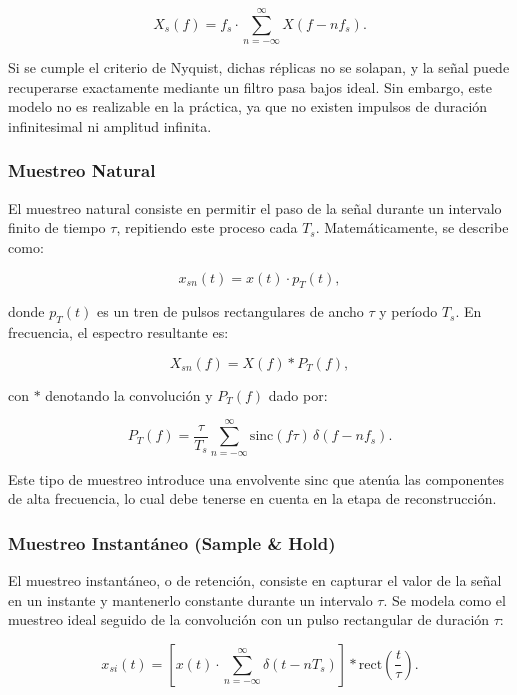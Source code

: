 \begin{equation}
    X_s(f) = f_s \cdot \sum_{n=-\infty}^{\infty} X(f-nf_s).
\end{equation}

Si se cumple el criterio de Nyquist, dichas réplicas no se solapan, y la señal puede recuperarse exactamente mediante un filtro pasa bajos ideal. Sin embargo, este modelo no es realizable en la práctica, ya que no existen impulsos de duración infinitesimal ni amplitud infinita.

\subsubsection{Muestreo Natural}
El muestreo natural consiste en permitir el paso de la señal durante un intervalo finito de tiempo $\tau$, repitiendo este proceso cada $T_s$. Matemáticamente, se describe como:

\begin{equation}
    x_{sn}(t) = x(t) \cdot p_T(t),
\end{equation}

donde $p_T(t)$ es un tren de pulsos rectangulares de ancho $\tau$ y período $T_s$.  
En frecuencia, el espectro resultante es:

\begin{equation}
    X_{sn}(f) = X(f) * P_T(f),
\end{equation}

con $*$ denotando la convolución y $P_T(f)$ dado por:

\begin{equation}
    P_T(f) = \frac{\tau}{T_s} \sum_{n=-\infty}^{\infty} \text{sinc}(f\tau)\,\delta(f-nf_s).
\end{equation}

Este tipo de muestreo introduce una envolvente $\text{sinc}$ que atenúa las componentes de alta frecuencia, lo cual debe tenerse en cuenta en la etapa de reconstrucción.

\subsubsection{Muestreo Instantáneo (Sample \& Hold)}
El muestreo instantáneo, o de retención, consiste en capturar el valor de la señal en un instante y mantenerlo constante durante un intervalo $\tau$. Se modela como el muestreo ideal seguido de la convolución con un pulso rectangular de duración $\tau$:

\begin{equation}
    x_{si}(t) = \left[ x(t) \cdot \sum_{n=-\infty}^{\infty} \delta(t-nT_s) \right] * \text{rect}\left(\frac{t}{\tau}\right).
\end{equation}

